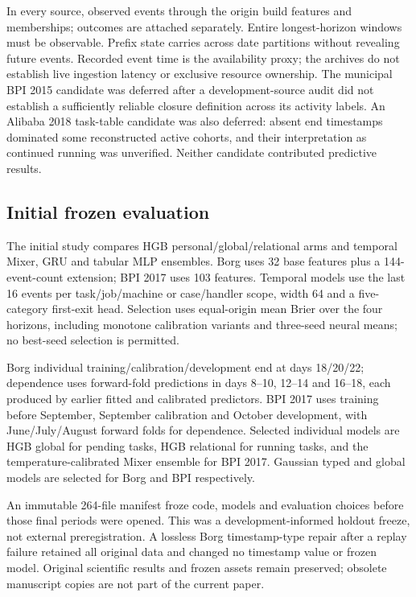 In every source, observed events through the origin build features and
memberships; outcomes are attached separately. Entire longest-horizon windows
must be observable. Prefix state carries across date partitions without
revealing future events. Recorded event time is the availability proxy;
the archives do not establish live ingestion latency or exclusive resource
ownership. The municipal BPI 2015 candidate was deferred after a
development-source audit did not establish a sufficiently reliable closure
definition across its activity labels. An Alibaba 2018 task-table candidate
was also deferred: absent end timestamps dominated some reconstructed active
cohorts, and their interpretation as continued running was unverified.
Neither candidate contributed predictive results.

\subsection{Initial frozen evaluation}
The initial study compares HGB personal/global/relational arms and temporal
Mixer, GRU and tabular MLP ensembles. Borg uses 32 base features plus a
144-event-count extension; BPI 2017 uses 103 features. Temporal models use
the last 16 events per task/job/machine or case/handler scope, width 64 and
a five-category first-exit head. Selection uses equal-origin mean Brier over
the four horizons, including monotone calibration variants and three-seed
neural means; no best-seed selection is permitted.

Borg individual training/calibration/development end at days 18/20/22;
dependence uses forward-fold predictions in days 8--10, 12--14 and 16--18,
each produced by earlier fitted and calibrated predictors. BPI 2017 uses
training before September, September calibration and October development,
with June/July/August forward folds for dependence. Selected individual
models are HGB global for pending tasks, HGB relational for running tasks,
and the temperature-calibrated Mixer ensemble for BPI 2017. Gaussian typed
and global models are selected for Borg and BPI respectively.

An immutable 264-file manifest froze code, models and evaluation choices
before those final periods were opened. This was a development-informed
holdout freeze, not external preregistration. A lossless Borg timestamp-type
repair after a replay failure retained all original data and changed no
timestamp value or frozen model. Original scientific results and frozen assets
remain preserved; obsolete manuscript copies are not part of the current paper.

